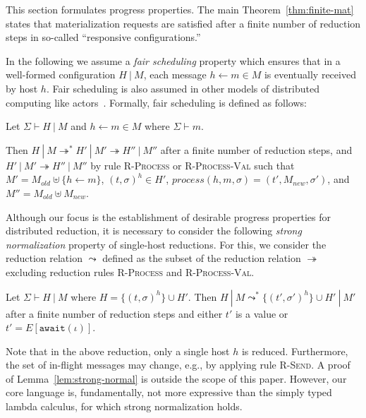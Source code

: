 This section formulates progress properties. The main
Theorem~\ref{thm:finite-mat} states that materialization requests are
satisfied after a finite number of reduction steps in so-called
``responsive configurations.''

In the following we assume a {\em fair scheduling} property which
ensures that in a well-formed configuration $H~|~M$, each message $h
\leftarrow m \in M$ is eventually received by host $h$. Fair
scheduling is also assumed in other models of distributed computing
like actors~\cite{Actors,Talcott}. Formally, fair scheduling is
defined as follows:

\begin{defn}\label{def:fair-scheduling}
  Let $\Sigma \vdash H~|~M$ and $h \leftarrow m \in M$ where $\Sigma
  \vdash m$.

  Then $H~|~M \twoheadrightarrow^* H'~|~M' \twoheadrightarrow
  H''~|~M''$ after a finite number of reduction steps, and $H'~|~M'
  \twoheadrightarrow H''~|~M''$ by rule \textsc{R-Process} or
  \textsc{R-Process-Val} such that $M' = M_{old} \uplus \{h \leftarrow
  m\}$, $(t, \sigma)^h \in H'$, $process(h, m, \sigma) = (t', M_{new},
  \sigma')$, and $M'' = M_{old} \uplus M_{new}$.
\end{defn}

Although our focus is the establishment of desirable progress
properties for distributed reduction, it is necessary to consider the
following {\em strong normalization} property of single-host
reductions. For this, we consider the reduction relation $\leadsto$
defined as the subset of the reduction relation $\twoheadrightarrow$
excluding reduction rules \textsc{R-Process} and
\textsc{R-Process-Val}.

\begin{lem}\label{lem:strong-normal}
  Let $\Sigma \vdash H~|~M$ where $H = \{ (t, \sigma)^h \} \cup
  H'$. Then $H~|~M \leadsto^* \{ (t', \sigma')^h \} \cup H'~|~M'$
  after a finite number of reduction steps and either $t'$ is a value
  or $t' = E[\texttt{await}(\iota)]$.
\end{lem}

Note that in the above reduction, only a single host $h$ is
reduced. Furthermore, the set of in-flight messages may change, e.g.,
by applying rule \textsc{R-Send}. A proof of
Lemma~\ref{lem:strong-normal} is outside the scope of this
paper. However, our core language is, fundamentally, not more
expressive than the simply typed lambda calculus, for which strong
normalization holds.

